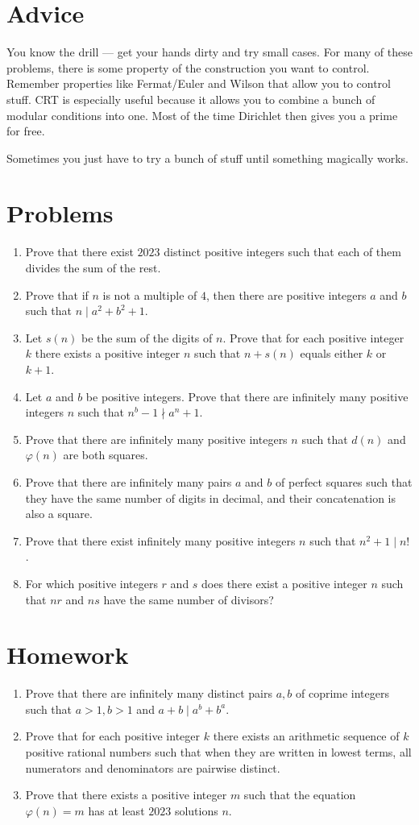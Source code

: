 \documentclass{article}
\begin{document}
\section{Advice}
You know the drill --- get your hands dirty and try small cases. For many of
these problems, there is some property of the construction you want to control.
Remember properties like Fermat/Euler and Wilson that allow you to control stuff.
CRT is especially useful because it allows
you to combine a bunch of modular conditions into one. Most of the time
Dirichlet then gives you a prime for free.

Sometimes you just have to try a bunch of stuff until something magically works.
\section{Problems}
\begin{enumerate}
	\item Prove that there exist $2023$ distinct positive integers such that each of them
	      divides the sum of the rest.
	\item Prove that if $n$ is not a multiple of $4$, then there are positive
	      integers $a$ and $b$ such that $n\mid a^2+b^2+1$.
	\item Let $s(n)$ be the sum of the digits of $n$. Prove that for each positive
	      integer $k$ there exists a positive integer $n$ such that $n+s(n)$ equals
	      either $k$ or $k+1$.
	\item Let $a$ and $b$ be positive integers. Prove that there are infinitely
	      many positive integers $n$ such that $n^b-1\nmid a^n+1$.
	\item Prove that there are infinitely many positive integers $n$ such that
	      $d(n)$ and $\varphi(n)$ are both squares.
	\item Prove that there are infinitely many pairs $a$ and $b$ of perfect
	      squares such that they have the same number of digits in decimal, and their
	      concatenation is also a square.
	\item Prove that there exist infinitely many positive integers $n$ such that
	      $n^2+1\mid n!$.
	\item For which positive integers $r$ and $s$ does there exist a positive
	      integer $n$ such that $nr$ and $ns$ have the same number of divisors?
\end{enumerate}
\newpage
\section{Homework}
\begin{enumerate}
	\item Prove that there are infinitely many distinct pairs $a,b$ of coprime
	      integers such that $a>1,b>1$ and $a+b\mid a^b+b^a$.
	\item Prove that for each positive integer $k$ there exists an arithmetic
	      sequence of $k$ positive rational numbers such that when they are written in lowest
	      terms, all numerators and denominators are pairwise distinct.
	\item Prove that there exists a positive integer $m$ such that the equation
	      $\varphi(n)=m$ has at least $2023$ solutions $n$.
\end{enumerate}
\end{document}
